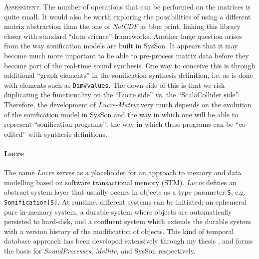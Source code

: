 \documentclass[11pt,a4paper]{article}
\newcommand{\software}[1]{\textit{#1}}
\newcommand{\sysson}[0]{SysSon}
\newcommand{\assessment}[0]{\textsc{Assessment:}}
\begin{document}
\assessment{} The number of operations that can be performed on the matrices is quite small. It would also be worth exploring the possibilities of using a different matrix abstraction than the one of \software{NetCDF} as blue print, linking this library closer with standard ``data science'' frameworks. Another huge question arises from the way sonification models are built in \sysson{}. It appears that it may become much more important to be able to pre-process matrix data before they become part of the real-time sound synthesis. One way to conceive this is through additional ``graph elements'' in the sonification synthesis definition, i.e. as is done with elements such as \verb!Dim#values!. The down-side of this is that we risk duplicating the functionality on the ``Lucre side'' vs. the ``ScalaCollider side''. Therefore, the development of \software{Lucre-Matrix} very much depends on the evolution of the sonification model in \sysson{} and the way in which one will be able to represent ``sonification programs'', the way in which these programs can be ``co-edited'' with synthesis definitions.

\paragraph{Lucre}

The name \software{Lucre} serves as a placeholder for an approach to memory and data modelling based on software transactional memory (STM). \software{Lucre} defines an abstract system layer that usually occurs in objects as a type parameter \verb!S!, e.g. \verb!Sonification[S]!. At runtime, different systems can be initiated: an ephemeral pure in-memory system, a durable system where objects are automatically persisted to hard-disk, and a confluent system which extends the durable system with a version history of the modification of objects. This kind of temporal database approach has been developed extensively through my thesis \autocite{rutz2014tracing}, and forms the basis for \software{SoundProcesses}, \software{Mellite}, and \sysson{} respectively.
\end{document}

